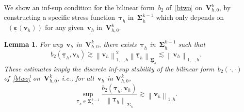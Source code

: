 \documentclass[a4paper,twoside,10pt]{article}
\theoremstyle{plain}
\newtheorem{lemma}[theorem]{Lemma}
\theoremstyle{remark}
\theoremstyle{definition}
\numberwithin{equation}{section}
\numberwithin{figure}{section}
\newcommand{\Norm}[1]{{\left\|{#1} \right\|}}
\newcommand{\Sigmah}{\underline{\boldsymbol{\Sigma}}_h}
\newcommand{\Sigmahkmo}{\Sigmah^{k-1}}
\newcommand{\Vhkz}{\Vbf_{h,0}^k}
\newcommand{\taubfh}{\underline{\boldsymbol{\tau}}_h}
\newcommand{\vbfh}{\mathbf{v}_h}
\DeclareMathOperator{\dev}{\underline{\mathbf{dev}}}
\newcommand{\btwo}{b_2}
\newcommand{\epsbfun}{\underline{\boldsymbol{\varepsilon}}}
\newcommand{\Vbf}{\mathbf{V}}
\begin{document}
We show an inf-sup condition for the bilinear form~$\btwo$ of~\eqref{btwo} on~$\Vhkz$,
by constructing a specific stress function~$\taubfh$ in~$\Sigmahkmo$
which only depends on~$\dev(\epsbfun(\vbfh))$ for any given~$\vbfh$ in~$\Vhkz$.
\begin{lemma} \label{lemma:discrete-inf-sup-bt}
For any~$\vbfh$ in~$\Vhkz$,
there exists~$\taubfh$ in~$\Sigmahkmo$ such that
\begin{subequations} \label{inf-sup:i-ii}
\begin{equation} \label{inf-sup:i}
\btwo(\taubfh,\vbfh) \gtrsim \Norm{\vbfh}_{1,\dev,h}^2
\end{equation}
\begin{equation} \label{inf-sup:ii}
\Norm{\taubfh}_{\Sigmah} \lesssim \Norm{\vbfh}_{1,\dev,h}.
\end{equation}
\end{subequations}
These estimates imply
the discrete inf-sup stability of the bilinear form~$\btwo(\cdot,\cdot)$ of~\eqref{btwo} on~$\Vhkz$,
i.e.,
for all~$\vbfh$ in $\Vhkz$,
\begin{equation} \label{discrete-inf-sup:btwo}
\sup_{\taubfh \in \Sigmahkmo} \frac{\btwo(\taubfh,\vbfh)}{\Norm{\taubfh}_{\Sigmah}}
    \gtrsim\Norm{\vbfh}_{1,h}.
\end{equation}
\end{lemma}
\end{document}
